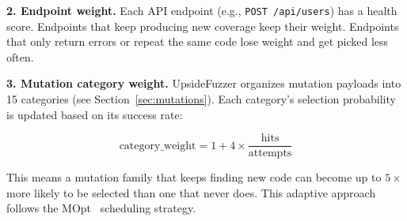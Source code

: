 \documentclass[conference]{IEEEtran}
\begin{document}
\textbf{2. Endpoint weight.} Each API endpoint (e.g., \texttt{POST /api/users}) has a health score. Endpoints that keep producing new coverage keep their weight. Endpoints that only return errors or repeat the same code lose weight and get picked less often.

\textbf{3. Mutation category weight.} UpsideFuzzer organizes mutation payloads into 15 categories (see Section~\ref{sec:mutations}). Each category's selection probability is updated based on its success rate:

\begin{equation}
  \text{category\_weight} = 1 + 4 \times \frac{\text{hits}}{\text{attempts}}
  \label{eq:mutcat_weight}
\end{equation}

This means a mutation family that keeps finding new code can become up to $5\times$ more likely to be selected than one that never does. This adaptive approach follows the MOpt~\cite{mopt} scheduling strategy.
\end{document}
